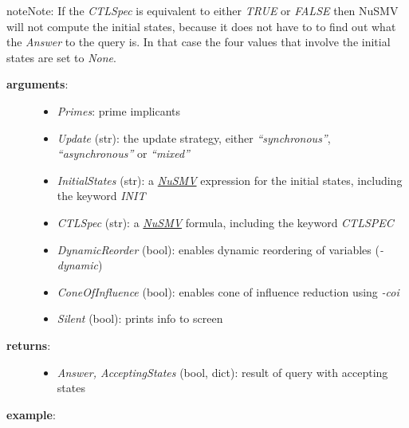 \documentclass[letterpaper,10pt,english]{sphinxmanual}
\begin{document}
\begin{fulllineitems}
\begin{notice}{note}{Note:}
If the \emph{CTLSpec} is equivalent to either \emph{TRUE} or \emph{FALSE} then NuSMV will not compute the initial states,
because it does not have to to find out what the \emph{Answer} to the query is.
In that case the four values that involve the initial states are set to \emph{None}.
\end{notice}
\begin{description}
\item[{\textbf{arguments}:}] \leavevmode\begin{itemize}
\item {} 
\emph{Primes}: prime implicants

\item {} 
\emph{Update} (str): the update strategy, either \emph{``synchronous''}, \emph{``asynchronous''} or \emph{``mixed''}

\item {} 
\emph{InitialStates} (str): a {\hyperref[Installation:installation-nusmv]{\emph{NuSMV}}} expression for the initial states, including the keyword \emph{INIT}

\item {} 
\emph{CTLSpec} (str): a {\hyperref[Installation:installation-nusmv]{\emph{NuSMV}}} formula, including the keyword \emph{CTLSPEC}

\item {} 
\emph{DynamicReorder} (bool): enables dynamic reordering of variables (\emph{-dynamic})

\item {} 
\emph{ConeOfInfluence} (bool): enables cone of influence reduction using \emph{-coi}

\item {} 
\emph{Silent} (bool): prints info to screen

\end{itemize}

\item[{\textbf{returns}:}] \leavevmode\begin{itemize}
\item {} 
\emph{Answer, AcceptingStates} (bool, dict): result of query with accepting states

\end{itemize}

\end{description}

\textbf{example}:


\end{fulllineitems}
\end{document}
